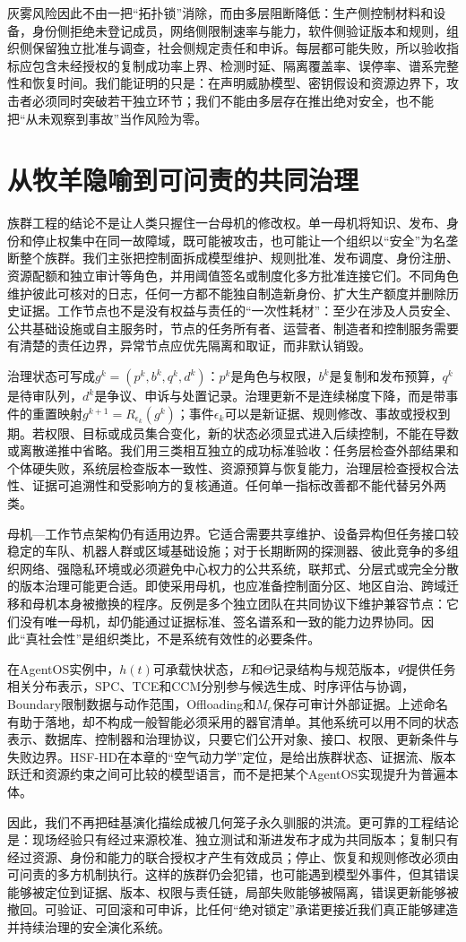 灰雾风险因此不由一把“拓扑锁”消除，而由多层阻断降低：生产侧控制材料和设备，身份侧拒绝未登记成员，网络侧限制速率与能力，软件侧验证版本和规则，组织侧保留独立批准与调查，社会侧规定责任和申诉。每层都可能失败，所以验收指标应包含未经授权的复制成功率上界、检测时延、隔离覆盖率、误停率、谱系完整性和恢复时间。我们能证明的只是：在声明威胁模型、密钥假设和资源边界下，攻击者必须同时突破若干独立环节；我们不能由多层存在推出绝对安全，也不能把“从未观察到事故”当作风险为零。

\section{从牧羊隐喻到可问责的共同治理}

族群工程的结论不是让人类只握住一台母机的修改权。单一母机将知识、发布、身份和停止权集中在同一故障域，既可能被攻击，也可能让一个组织以“安全”为名垄断整个族群。我们主张把控制面拆成模型维护、规则批准、发布调度、身份注册、资源配额和独立审计等角色，并用阈值签名或制度化多方批准连接它们。不同角色维护彼此可核对的日志，任何一方都不能独自制造新身份、扩大生产额度并删除历史证据。工作节点也不是没有权益与责任的“一次性耗材”：至少在涉及人员安全、公共基础设施或自主服务时，节点的任务所有者、运营者、制造者和控制服务需要有清楚的责任边界，异常节点应优先隔离和取证，而非默认销毁。

治理状态可写成$g^k=(p^k,b^k,q^k,d^k)$：$p^k$是角色与权限，$b^k$是复制和发布预算，$q^k$是待审队列，$d^k$是争议、申诉与处置记录。治理更新不是连续梯度下降，而是带事件的重置映射$g^{k+1}=R_{\epsilon_k}(g^k)$；事件$\epsilon_k$可以是新证据、规则修改、事故或授权到期。若权限、目标或成员集合变化，新的状态必须显式进入后续控制，不能在导数或离散递推中省略。我们用三类相互独立的成功标准验收：任务层检查外部结果和个体硬失败，系统层检查版本一致性、资源预算与恢复能力，治理层检查授权合法性、证据可追溯性和受影响方的复核通道。任何单一指标改善都不能代替另外两类。

母机—工作节点架构仍有适用边界。它适合需要共享维护、设备异构但任务接口较稳定的车队、机器人群或区域基础设施；对于长期断网的探测器、彼此竞争的多组织网络、强隐私环境或必须避免中心权力的公共系统，联邦式、分层式或完全分散的版本治理可能更合适。即使采用母机，也应准备控制面分区、地区自治、跨域迁移和母机本身被撤换的程序。反例是多个独立团队在共同协议下维护兼容节点：它们没有唯一母机，却仍能通过证据标准、签名谱系和一致的能力边界协同。因此“真社会性”是组织类比，不是系统有效性的必要条件。

在AgentOS实例中，$h(t)$可承载快状态，$E$和$\Theta$记录结构与规范版本，$\Psi$提供任务相关分布表示，SPC、TCE和CCM分别参与候选生成、时序评估与协调，Boundary限制数据与动作范围，Offloading和$M_e$保存可审计外部证据。上述命名有助于落地，却不构成一般智能必须采用的器官清单。其他系统可以用不同的状态表示、数据库、控制器和治理协议，只要它们公开对象、接口、权限、更新条件与失败边界。HSF-HD在本章的“空气动力学”定位，是给出族群状态、证据流、版本跃迁和资源约束之间可比较的模型语言，而不是把某个AgentOS实现提升为普遍本体。

因此，我们不再把硅基演化描绘成被几何笼子永久驯服的洪流。更可靠的工程结论是：现场经验只有经过来源校准、独立测试和渐进发布才成为共同版本；复制只有经过资源、身份和能力的联合授权才产生有效成员；停止、恢复和规则修改必须由可问责的多方机制执行。这样的族群仍会犯错，也可能遇到模型外事件，但其错误能够被定位到证据、版本、权限与责任链，局部失败能够被隔离，错误更新能够被撤回。可验证、可回滚和可申诉，比任何“绝对锁定”承诺更接近我们真正能够建造并持续治理的安全演化系统。

